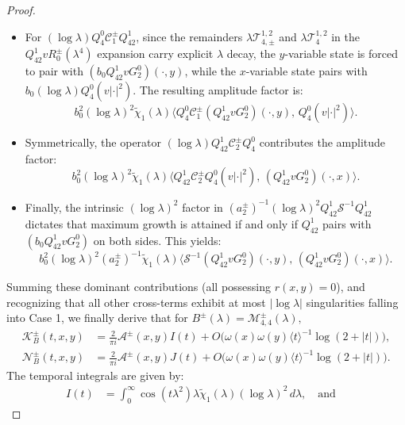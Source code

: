 \documentclass[reqno]{amsart}
\numberwithin{equation}{section}
\begin{document}
\begin{proof}
\begin{itemize}
		\[
		b_0^2 (\log\lambda)^2\widetilde{\chi}_1(\lambda) \langle Q_4^0\mathcal{C}^\pm Q_4^0(v |\cdot|^2), \, Q_4^0(v |\cdot|^2)\rangle.
		\]
		\item For $(\log \lambda)Q_4^0 \mathcal{C}_1^\pm Q_{42}^1$, since
		the remainders $\lambda\mathcal{T}_{4,\pm}^{1,2}$ and $ \lambda\mathcal{T}_{4}^{1,2}$ in the $Q_{42}^1v	R_0^\pm(\lambda^4)$ expansion  carry explicit $\lambda$ decay, the $y$-variable state is forced to pair with  $(b_0 Q_{42}^1 v G_2^0)(\cdot, y)$, while the $x$-variable state pairs with $b_0(\log\lambda)Q_4^0(v |\cdot|^2)$. The resulting amplitude factor is:
		\[
		b_0^2 (\log\lambda)^2\widetilde{\chi}_1(\lambda) \langle Q_4^0 \mathcal{C}_1^\pm (Q_{42}^1 v G_2^0)(\cdot,y), \, Q_4^0(v |\cdot|^2)\rangle.
		\]
		\item Symmetrically, the operator $(\log \lambda)Q_{42}^1 \mathcal{C}_2^\pm Q_4^0$ contributes the amplitude factor:
		\[
		b_0^2 (\log\lambda)^2\widetilde{\chi}_1(\lambda) \langle Q_{42}^1 \mathcal{C}_2^\pm Q_4^0(v |\cdot|^2), \, (Q_{42}^1 v G_2^0)(\cdot,x)\rangle.
		\]
		\item Finally, the intrinsic $(\log\lambda)^2$ factor in $(a_2^\pm)^{-1}(\log \lambda)^2  Q_{42}^1 \mathcal{S}^{-1} Q_{42}^1$ dictates that maximum growth is attained if and only if $Q_{42}^1$ pairs with $(b_0 Q_{42}^1 vG_2^0)$ on both sides. This yields:
		\[
		b_0^2 (\log\lambda)^2 (a_2^\pm)^{-1}\widetilde{\chi}_1(\lambda) \langle \mathcal{S}^{-1} (Q_{42}^1 v G_2^0)(\cdot,y), \, (Q_{42}^1 v G_2^0)(\cdot,x) \rangle.
		\]
	\end{itemize}
	Summing these dominant contributions (all possessing $r(x,y) = 0$), and recognizing that all other cross-terms exhibit at most $|\log\lambda|$ singularities falling into Case 1, we  finally derive that  for $B^\pm(\lambda)= \mathcal{M}_{4,4}^{\pm}(\lambda),$
	\begin{equation}  \label{K-N}	\begin{split}
    \mathcal{K}_{B}^{\pm}(t,x,y) &= \frac{2}{\pi i}\mathcal{A}^\pm(x,y) I(t) + {O}\bigl(\omega(x)\omega(y)\langle t \rangle^{-1}\log(2+|t|)\bigr), \\ \mathcal{N}_{B}^{\pm}(t,x,y) &= \frac{2}{\pi i}\mathcal{A}^\pm(x,y) J(t) + O\bigl(\omega(x)\omega(y)\langle t \rangle^{-1}\log(2+|t|)\bigr).  \end{split}
	\end{equation}    
	The temporal integrals are given by:
	\begin{align*}
		I(t) &= \int_0^\infty\cos(t\lambda^2)\lambda\widetilde{\chi}_1(\lambda)(\log\lambda)^2 \, d\lambda, \quad\text{and}\quad

\end{align*}
\end{proof}
\end{document}

